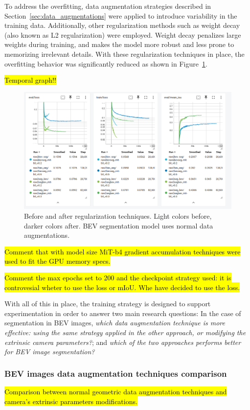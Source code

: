 To address the overfitting, data augmentation strategies described in Section~\ref{sec:data_augmentations} were applied to introduce variability in the training data. Additionally, other regularization methods such as weight decay (also known as L2 regularization) were employed. Weight decay penalizes large weights during training, and makes the model more robust and less prone to memorizing irrelevant details. With these regularization techniques in place, the overfitting behavior was significantly reduced as shown in Figure~\ref{fig:before_after_data_aug}.

\hl{Temporal graph!!}
\begin{figure}[h!]
    \centering
    \includegraphics[width=0.7\linewidth]{./images/experiments/before_an_after_data_aug.png}
    \caption{Before and after regularization techniques. Light colors before, darker colors after. BEV segmentation model uses normal data augmentations.}
    \label{fig:before_after_data_aug}
\end{figure}

\hl{Comment that with model size MiT-b4 gradient accumulation techniques were used to fit the GPU memory specs.}

\hl{Comment the max epochs set to 200 and the checkpoint strategy used: it is controvesial wheter to use the loss or mIoU. Whe have decided to use the loss.}

With all of this in place, the training strategy is designed to support experimentation in order to answer two main research questions: In the case of segmentation in BEV images, \textit{which data augmentation technique is more effective: using the same strategy applied in the other approach, or modifying the extrinsic camera parameters?}; and \textit{which of the two approaches performs better for BEV image segmentation?}

\subsubsection{BEV images data augmentation techniques comparison}
\hl{Comparison between normal geometric data augmentation techniques and camera's extrinsic parameters modifications.}


